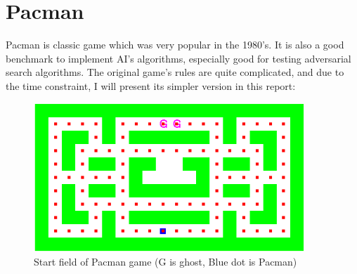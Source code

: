\documentclass[a4paper, 11pt]{article}
\begin{document}

\newpage
\section{Pacman}

Pacman is classic game which was very popular in the 1980's. It is also a good benchmark to implement AI's algorithms, especially good for testing adversarial search algorithms. The original game's rules are quite complicated, and due to the time constraint, I will present its simpler version in this report:
\begin{figure}[hbt]
  \centering
  \includegraphics[width=4in]{field1-start}
  \caption[Close up of \textit{Hemidactylus} sp.]
  {Start field of Pacman game (G is ghost, Blue dot is Pacman)}
\end{figure}
\end{document}
